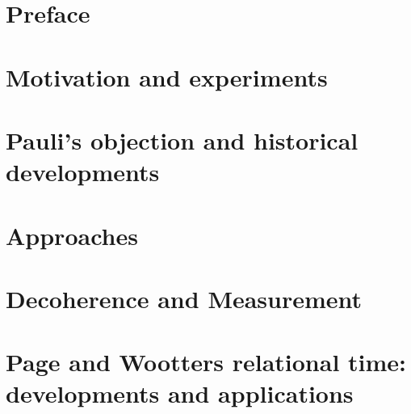 




\frontmatter

\maketitle

\tableofcontents

\listoffigures
 
\listoftables

\chapter*{Preface}


\mainmatter

\chapter{Motivation and experiments}

\fi

\chapter{Pauli's objection and historical developments}


\chapter{Approaches}

\fi

\chapter{Decoherence and Measurement}









\chapter{Page and Wootters relational time: developments and applications}
  \label{ch:pw}



\fi

